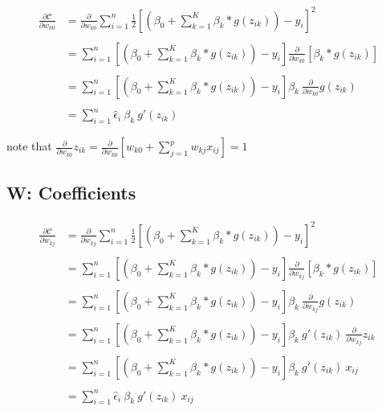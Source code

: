\documentclass[
]{book}
\begin{document}
\[
\begin{aligned}
\frac{\partial \mathcal{C}}{\partial w_{k0}} &= \frac{\partial}{\partial w_{k0}} \sum_{i = 1}^n \frac{1}{2} \left[\left(\beta_0 + \sum_{k = 1}^K \beta_k * g(z_{ik})\right) - y_i\right]^2 \\ \\
&= \sum_{i = 1}^n \left[\left(\beta_0 + \sum_{k = 1}^K \beta_k * g(z_{ik})\right) - y_i\right] \frac{\partial}{\partial w_{k0}} [\beta_k * g(z_{ik})] \\ \\
&= \sum_{i = 1}^n \left[\left(\beta_0 + \sum_{k = 1}^K \beta_k * g(z_{ik})\right) - y_i\right] \beta_k \ \frac{\partial}{\partial w_{k0}} g(z_{ik}) \\ \\
&= \sum_{i = 1}^n \hat \epsilon_i \ \beta_k \ g'(z_{ik})
\end{aligned}
\]

note that \(\frac{\partial}{\partial w_{k0}} z_{ik} = \frac{\partial}{\partial w_{k0}} \left[w_{k0} + \sum_{j = 1}^p w_{kj} x_{ij}\right] = 1\)

\hypertarget{w-coefficients}{%
\subsection{W: Coefficients}\label{w-coefficients}}

\[
\begin{aligned}
\frac{\partial \mathcal{C}}{\partial w_{kj}} &= \frac{\partial}{\partial w_{kj}} \sum_{i = 1}^n \frac{1}{2} \left[\left(\beta_0 + \sum_{k = 1}^K \beta_k * g(z_{ik})\right) - y_i\right]^2 \\ \\
&= \sum_{i = 1}^n \left[\left(\beta_0 + \sum_{k = 1}^K \beta_k * g(z_{ik})\right) - y_i\right] \frac{\partial}{\partial w_{kj}} [\beta_k * g(z_{ik})] \\ \\
&= \sum_{i = 1}^n \left[\left(\beta_0 + \sum_{k = 1}^K \beta_k * g(z_{ik})\right) - y_i\right] \beta_k \ \frac{\partial}{\partial w_{kj}} g(z_{ik}) \\ \\
&= \sum_{i = 1}^n \left[\left(\beta_0 + \sum_{k = 1}^K \beta_k * g(z_{ik})\right) - y_i\right] \beta_k \ g'(z_{ik}) \ \frac{\partial}{\partial w_{kj}} z_{ik} \\ \\
&= \sum_{i = 1}^n \left[\left(\beta_0 + \sum_{k = 1}^K \beta_k * g(z_{ik})\right) - y_i\right] \beta_k \ g'(z_{ik}) \ x_{ij} \\ \\
&= \sum_{i = 1}^n \hat \epsilon_i \ \beta_k \ g'(z_{ik}) \ x_{ij}
\end{aligned}
\]
\end{document}
